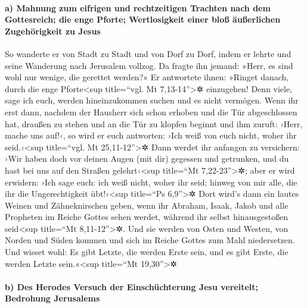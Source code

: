 \hypertarget{a-mahnung-zum-eifrigen-und-rechtzeitigen-trachten-nach-dem-gottesreich-die-enge-pforte-wertlosigkeit-einer-blouxdf-uxe4uuxdferlichen-zugehuxf6rigkeit-zu-jesus}{%
\paragraph{a) Mahnung zum eifrigen und rechtzeitigen Trachten nach dem
Gottesreich; die enge Pforte; Wertlosigkeit einer bloß äußerlichen
Zugehörigkeit zu
Jesus}\label{a-mahnung-zum-eifrigen-und-rechtzeitigen-trachten-nach-dem-gottesreich-die-enge-pforte-wertlosigkeit-einer-blouxdf-uxe4uuxdferlichen-zugehuxf6rigkeit-zu-jesus}}

 So wanderte er von Stadt zu Stadt und von Dorf zu Dorf,
indem er lehrte und seine Wanderung nach Jerusalem vollzog.
 Da fragte ihn jemand: »Herr, es sind wohl nur wenige,
die gerettet werden?« Er antwortete ihnen:  »Ringet
danach, durch die enge Pforte\textless sup title=``vgl. Mt
7,13-14''\textgreater✲ einzugehen! Denn viele, sage ich euch, werden
hineinzukommen suchen und es nicht vermögen.  Wenn ihr
erst dann, nachdem der Hausherr sich schon erhoben und die Tür
abgeschlossen hat, draußen zu stehen und an die Tür zu klopfen beginnt
und ihm zuruft: ›Herr, mache uns auf!‹, so wird er euch antworten: ›Ich
weiß von euch nicht, woher ihr seid.‹\textless sup title=``vgl. Mt
25,11-12''\textgreater✲  Dann werdet ihr anfangen zu
versichern: ›Wir haben doch vor deinen Augen (mit dir) gegessen und
getrunken, und du hast bei uns auf den Straßen gelehrt‹\textless sup
title=``Mt 7,22-23''\textgreater✲;  aber er wird
erwidern: ›Ich sage euch: ich weiß nicht, woher ihr seid; hinweg von mir
alle, die ihr die Ungerechtigkeit übt!‹\textless sup title=``Ps
6,9''\textgreater✲  Dort wird's dann ein lautes Weinen
und Zähneknirschen geben, wenn ihr Abraham, Isaak, Jakob und alle
Propheten im Reiche Gottes sehen werdet, während ihr selbst
hinausgestoßen seid\textless sup title=``Mt 8,11-12''\textgreater✲.
 Und sie werden von Osten und Westen, von Norden und
Süden kommen und sich im Reiche Gottes zum Mahl niedersetzen.
 Und wisset wohl: Es gibt Letzte, die werden Erste sein,
und es gibt Erste, die werden Letzte sein.«\textless sup title=``Mt
19,30''\textgreater✲

\hypertarget{b-des-herodes-versuch-der-einschuxfcchterung-jesu-vereitelt-bedrohung-jerusalems}{%
\paragraph{b) Des Herodes Versuch der Einschüchterung Jesu vereitelt;
Bedrohung
Jerusalems}\label{b-des-herodes-versuch-der-einschuxfcchterung-jesu-vereitelt-bedrohung-jerusalems}}

